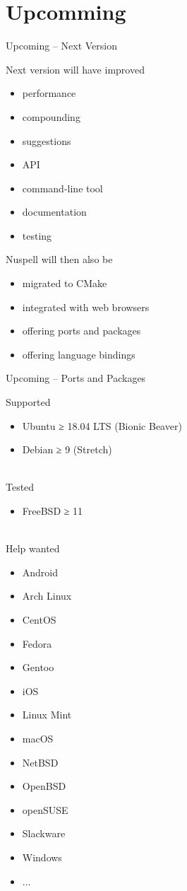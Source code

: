 \documentclass{beamer}
\begin{document}
\section{Upcomming}

\begin{frame}{Upcoming – Next Version}
\begin{multicols}{2}
Next version will have improved
\begin{itemize}
\item \alert{performance}
\item compounding
\item suggestions
\item API
\item command-line tool
\item documentation
\item testing
\end{itemize}
Nuspell will then also be
\begin{itemize}
\item migrated to CMake
\item integrated with web browsers
\item offering ports and packages
\item offering language bindings
\end{itemize}
\end{multicols}
\end{frame}

\begin{frame}{Upcoming – Ports and Packages}
\begin{multicols}{2}
Supported
\begin{itemize}
\item Ubuntu ≥ 18.04 LTS (Bionic Beaver)
\item Debian ≥ 9 (Stretch)
\end{itemize}
\mbox{}\\
Tested
\begin{itemize}
\item FreeBSD ≥ 11
\end{itemize}
\mbox{}\\
Help wanted
\begin{itemize}
\item Android
\item Arch Linux
\item CentOS
\item Fedora
\item Gentoo
\item iOS
\item Linux Mint
\item macOS
\item NetBSD
\item OpenBSD
\item openSUSE
\item Slackware
\item Windows
\item ...
\end{itemize}
\end{multicols}
\end{frame}
\end{document}
